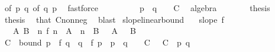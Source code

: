 \begin{isabellebody}
\ {\isacharasterisk}{\kern0pt}{\isacharbrackleft}{\kern0pt}of\ p\ q{\isacharbrackright}{\kern0pt}\ {\isacharasterisk}{\kern0pt}{\isacharbrackleft}{\kern0pt}of\ q\ p{\isacharbrackright}{\kern0pt}\ \isamarkupfalse%
\ fastforce\isanewline
\ \ \ \ \isamarkupfalse%
\ \isamarkupfalse%
\ {\isachardoublequoteopen}{\isachardot}{\kern0pt}{\isachardot}{\kern0pt}{\isachardot}{\kern0pt}\ {\isacharequal}{\kern0pt}\ {\isacharparenleft}{\kern0pt}{\isasymbar}p{\isasymbar}\ {\isacharplus}{\kern0pt}\ {\isasymbar}q{\isasymbar}\ {\isacharplus}{\kern0pt}\ {}{\isacharparenright}{\kern0pt}\ {\isacharasterisk}{\kern0pt}\ C{\isachardoublequoteclose}\ \isamarkupfalse%
\ algebra\isanewline
\ \ \ \ \isamarkupfalse%
\ \isamarkupfalse%
\ {\isacharquery}{\kern0pt}thesis\ \isacommand{{\isachardot}{\kern0pt}}\isamarkupfalse%
\isanewline
\ \ \isamarkupfalse%
\isanewline
\ \ \isamarkupfalse%
\ {\isacharquery}{\kern0pt}thesis\ \isamarkupfalse%
\ that\ C{\isacharunderscore}{\kern0pt}nonneg\ \isamarkupfalse%
\ blast\isanewline
{}\isamarkupfalse%
%
\endisatagproof
{\isafoldproof}%
%
\isadelimproof
\isanewline
%
\endisadelimproof
\isanewline
{}\isamarkupfalse%
\ slope{\isacharunderscore}{\kern0pt}linear{\isacharunderscore}{\kern0pt}bound{\isacharcolon}{\kern0pt}\isanewline
\ \ \ {\isachardoublequoteopen}slope\ f{\isachardoublequoteclose}\isanewline
\ \ \ A\ B\ \ {\isachardoublequoteopen}{\isasymforall}n{\isachardot}{\kern0pt}\ {\isasymbar}f\ n{\isasymbar}\ {\isasymle}\ A\ {\isacharasterisk}{\kern0pt}\ {\isasymbar}n{\isasymbar}\ {\isacharplus}{\kern0pt}\ B{\isachardoublequoteclose}\ {\isachardoublequoteopen}{}\ {\isasymle}\ A{\isachardoublequoteclose}\ {\isachardoublequoteopen}{}\ {\isasymle}\ B{\isachardoublequoteclose}\isanewline
%
\isadelimproof
%
\endisadelimproof
%
\isatagproof
{}\isamarkupfalse%
\ {\isacharminus}{\kern0pt}\isanewline
\ \ \isamarkupfalse%
\ C\ \ bound{\isacharcolon}{\kern0pt}\ {\isachardoublequoteopen}{\isasymbar}p\ {\isacharasterisk}{\kern0pt}\ f\ q\ {\isacharminus}{\kern0pt}\ q\ {\isacharasterisk}{\kern0pt}\ f\ p{\isasymbar}\ {\isasymle}\ {\isacharparenleft}{\kern0pt}{\isasymbar}p{\isasymbar}\ {\isacharplus}{\kern0pt}\ {\isasymbar}q{\isasymbar}\ {\isacharplus}{\kern0pt}\ {}{\isacharparenright}{\kern0pt}\ {\isacharasterisk}{\kern0pt}\ C{\isachardoublequoteclose}\ {\isachardoublequoteopen}{}\ {\isasymle}\ C{\isachardoublequoteclose}\ \ p\ q\ \isamarkupfalse%

\end{isabellebody}
